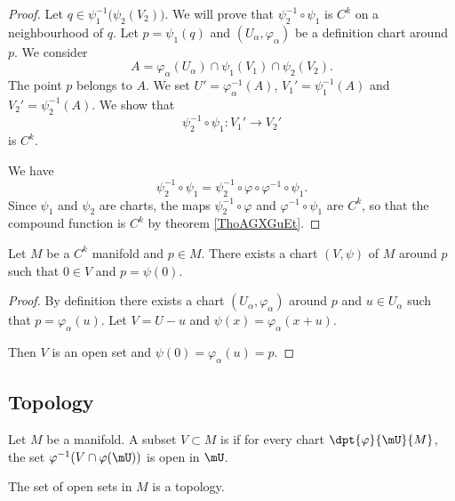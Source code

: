 \begin{proof}
	Let \( q\in \psi_1^{-1}\big( \psi_2(V_2) \big)\). We will prove that \( \psi_2^{-1}\circ\psi_1\) is \( C^k\) on a neighbourhood of \( q\).  Let \( p=\psi_1(q)\) and \( (U_{\alpha},\varphi_{\alpha})\) be a definition chart around \( p\). We consider
	\begin{equation}
		A=\varphi_{\alpha}(U_{\alpha})\cap\psi_1(V_1)\cap\psi_2(V_2).
	\end{equation}
	The point \( p\) belongs to \( A\). We set \( U'=\varphi_{\alpha}^{-1}(A)\), \( V_1'=\psi_1^{-1}(A)\) and \( V_2'=\psi_2^{-1}(A)\). We show that
	\begin{equation}
		\psi_2^{-1}\circ\psi_1\colon V_1'\to V_2'
	\end{equation}
	is \( C^k\).

	We have
	\begin{equation}
		\psi_2^{-1}\circ\psi_1=\psi_2^{-1}\circ\varphi\circ\varphi^{-1}\circ\psi_1.
	\end{equation}
	Since \( \psi_1\) and \( \psi_2\) are charts, the maps \( \psi_2^{-1}\circ \varphi\) and \( \varphi^{-1}\circ\psi_1\) are \( C^k\), so that the compound function is \( C^k\) by theorem \ref{ThoAGXGuEt}.
\end{proof}

\begin{lemma}       \label{LEMooOPPJooXezOHS}
	Let \( M\) be a \( C^k\) manifold and \( p\in M\). There exists a chart \( (V,\psi)\) of \( M\) around \( p\) such that \( 0\in V\) and \( p=\psi(0)\).
\end{lemma}

\begin{proof}
	By definition there exists a chart \( (U_{\alpha},\varphi_{\alpha})\) around \( p\) and \( u\in U_{\alpha}\) such that \( p=\varphi_{\alpha}(u)\). Let \( V=U-u\) and \( \psi(x)=\varphi_{\alpha}(x+u)\).

	Then \( V\) is an open set and \( \psi(0)=\varphi_{\alpha}(u)=p\).
\end{proof}

\subsection{Topology}

\begin{propositionDef}      \label{DEFooHGNOooNqGmxE}
	Let \( M\) be a manifold. A subset $V\subset M$ is  if for every chart $\dpt{\varphi}{\mU}{M}$, the set $\varphi^{-1}(V\cap\varphi(\mU))$ is open in $\mU$.

	The set of open sets in \( M\) is a topology.
\end{propositionDef}

